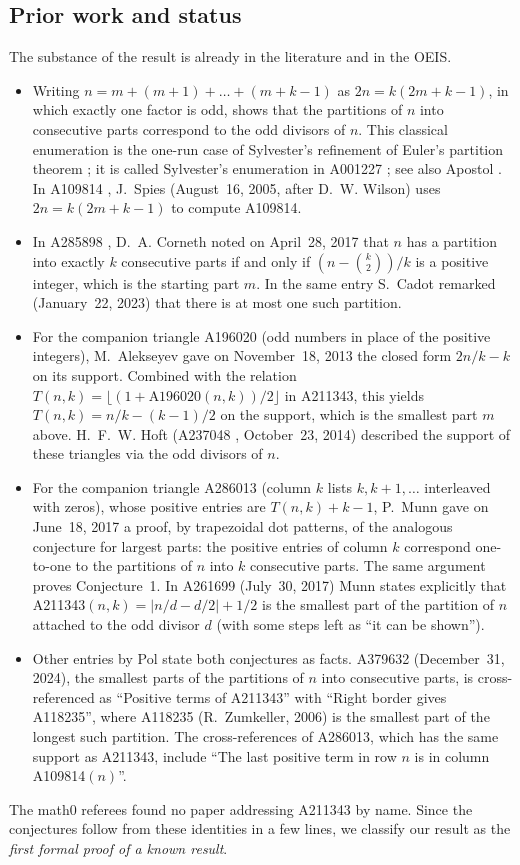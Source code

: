 \documentclass[11pt]{amsart}
\theoremstyle{plain}
\theoremstyle{definition}
\begin{document}
\subsection*{Prior work and status}
The substance of the result is already in the literature and in the OEIS.
\begin{itemize}
\item Writing $n=m+(m+1)+\dots+(m+k-1)$ as $2n=k(2m+k-1)$, in which exactly one factor is odd, shows that the partitions of $n$ into consecutive parts correspond to the odd divisors of $n$. This classical enumeration is the one-run case of Sylvester's refinement of Euler's partition theorem \cite{Sylvester}; it is called Sylvester's enumeration in A001227 \cite{A001227}; see also Apostol \cite{Apostol}. In A109814 \cite{A109814}, J.~Spies (August~16, 2005, after D.~W. Wilson) uses $2n=k(2m+k-1)$ to compute A109814.
\item In A285898 \cite{A285898}, D.~A. Corneth noted on April~28, 2017 that $n$ has a partition into exactly $k$ consecutive parts if and only if $(n-\binom k2)/k$ is a positive integer, which is the starting part $m$. In the same entry S.~Cadot remarked (January~22, 2023) that there is at most one such partition.
\item For the companion triangle A196020 \cite{A196020} (odd numbers in place of the positive integers), M.~Alekseyev gave on November~18, 2013 the closed form $2n/k-k$ on its support. Combined with the relation $T(n,k)=\lfloor(1+\text{A196020}(n,k))/2\rfloor$ in A211343, this yields $T(n,k)=n/k-(k-1)/2$ on the support, which is the smallest part $m$ above. H.~F.~W. Hoft (A237048 \cite{A237048}, October~23, 2014) described the support of these triangles via the odd divisors of $n$.
\item For the companion triangle A286013 \cite{A286013} (column $k$ lists $k,k+1,\dots$ interleaved with zeros), whose positive entries are $T(n,k)+k-1$, P.~Munn gave on June~18, 2017 a proof, by trapezoidal dot patterns, of the analogous conjecture for largest parts: the positive entries of column $k$ correspond one-to-one to the partitions of $n$ into $k$ consecutive parts. The same argument proves Conjecture~1. In A261699 \cite{A261699} (July~30, 2017) Munn states explicitly that A211343$(n,k)=|n/d-d/2|+1/2$ is the smallest part of the partition of $n$ attached to the odd divisor $d$ (with some steps left as ``it can be shown'').
\item Other entries by Pol state both conjectures as facts. A379632 \cite{A379632} (December~31, 2024), the smallest parts of the partitions of $n$ into consecutive parts, is cross-referenced as ``Positive terms of A211343'' with ``Right border gives A118235'', where A118235 \cite{A118235} (R.~Zumkeller, 2006) is the smallest part of the longest such partition. The cross-references of A286013, which has the same support as A211343, include ``The last positive term in row $n$ is in column A109814$(n)$''.
\end{itemize}
The math0 referees found no paper addressing A211343 by name. Since the conjectures follow from these identities in a few lines, we classify our result as the \emph{first formal proof of a known result}.
\end{document}
